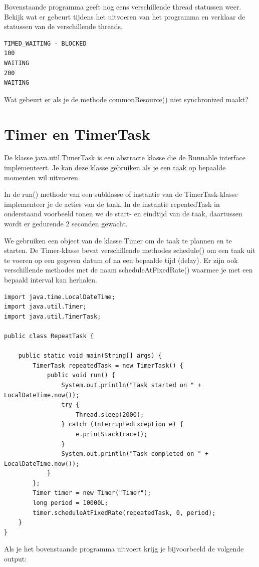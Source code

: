 \documentclass{tstextbook}
\begin{document}
Bovenstaande programma geeft nog eens verschillende thread statussen weer.
Bekijk wat er gebeurt tijdens het uitvoeren van het programma en verklaar de statussen van de verschillende threads.

\begin{verbatim}
TIMED_WAITING - BLOCKED
100
WAITING
200
WAITING
\end{verbatim}

Wat gebeurt er als je de methode commonResource() niet synchronized maakt?

\section{Timer en TimerTask}

De klasse java.util.TimerTask is een abstracte klasse die de Runnable interface implementeert. Je kan deze klasse gebruiken als je een taak op bepaalde momenten wil uitvoeren. 

In de run() methode van een subklasse of instantie van de TimerTask-klasse implementeer je de acties van de taak. In de instantie repeatedTask in onderstaand voorbeeld tonen we de start- en eindtijd van de taak, daartussen wordt er gedurende 2 seconden gewacht.

We gebruiken een object van de klasse Timer om de taak te plannen en te starten.
De Timer-klasse bevat verschillende methodes schedule() om een taak uit te voeren op een gegeven datum of na een bepaalde tijd (delay). Er zijn ook verschillende methodes met de naam scheduleAtFixedRate() waarmee je met een bepaald interval kan herhalen. 

\begin{lstlisting}
import java.time.LocalDateTime;
import java.util.Timer;
import java.util.TimerTask;

public class RepeatTask {

	public static void main(String[] args) {
		TimerTask repeatedTask = new TimerTask() {
			public void run() {
				System.out.println("Task started on " + LocalDateTime.now());
				try {
					Thread.sleep(2000);
				} catch (InterruptedException e) {
					e.printStackTrace();
				}
				System.out.println("Task completed on " + LocalDateTime.now());
			}
		};
		Timer timer = new Timer("Timer");
		long period = 10000L;
		timer.scheduleAtFixedRate(repeatedTask, 0, period);
	}
}
\end{lstlisting}

Als je het bovenstaande programma uitvoert krijg je bijvoorbeeld de volgende output:
\end{document}
